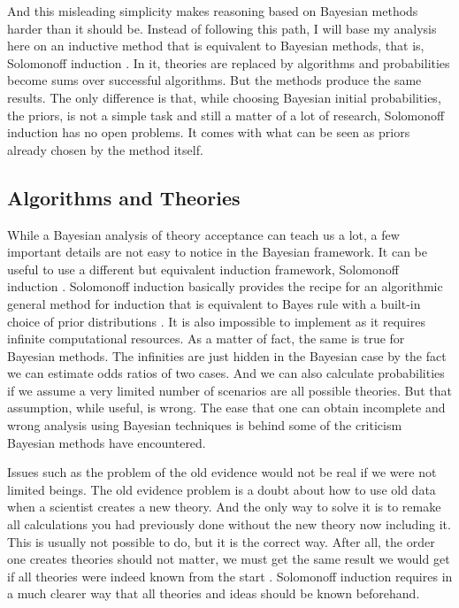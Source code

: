 \documentclass{article}
\begin{document}
	And this misleading simplicity makes reasoning based on Bayesian methods harder than it should be. Instead of following this path, I will base my analysis here on an inductive method that is equivalent to Bayesian methods, that is, Solomonoff induction \cite{solomonoff64a}. In it, theories are replaced by algorithms and probabilities become sums over successful algorithms. But the methods produce the same results. The only difference is that, while choosing Bayesian initial probabilities, the priors,  is not a simple task and still a matter of a lot of research, Solomonoff induction has no open problems. It comes with what can be seen as priors already chosen by the method itself.
	
	
	
	
	
	
	
	\subsection{Algorithms and Theories}
	
	While a Bayesian analysis of theory acceptance can teach us a lot, a few important details are not easy to notice in the Bayesian framework. It can be useful to use a different but equivalent induction framework, Solomonoff induction \cite{solomonoff64a}. Solomonoff induction basically provides the recipe for an algorithmic general method for induction that is equivalent to Bayes rule with a built-in choice of prior distributions \cite{hutter07a,rathmannerhutter11a}. It is also impossible to implement as it requires infinite computational resources. As a matter of fact, the same is true for Bayesian methods. The infinities are just hidden in the Bayesian case by the fact we can estimate odds ratios of two cases. And we can also calculate probabilities if we assume a very limited number of scenarios are all possible theories. But that assumption, while useful, is wrong. The ease that one can obtain incomplete and wrong analysis using Bayesian techniques is behind some of the criticism Bayesian methods have encountered. 
	
	Issues such as the problem of the old evidence \cite{garber83a} would not be real if we were not limited beings. The old evidence problem is a doubt about how to use old data when a scientist creates a new theory. And the only way to solve it is to remake all calculations you had previously done without the new theory now including it. This is usually not possible to do, but it is the correct way. After all, the order one creates theories should not matter, we must get the same result we would get if all theories were indeed known from the start .  Solomonoff induction requires in a much clearer way that all theories and ideas should be known beforehand. 
	
\end{document}
